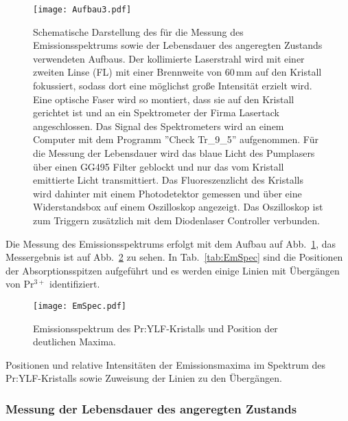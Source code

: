 \begin{figure}[H]
\begin{center}
  \texttt{[image: Aufbau3.pdf]}
  \caption{Schematische Darstellung des für die Messung des Emissionsspektrums sowie der
  Lebensdauer des angeregten Zustands verwendeten Aufbaus.
    Der kollimierte Laserstrahl wird mit einer zweiten Linse (FL) mit einer Brennweite von 60\,mm auf
  den Kristall fokussiert, sodass dort eine möglichst große Intensität erzielt wird.
  Eine optische Faser wird so montiert, dass sie auf den Kristall gerichtet ist und an ein
  Spektrometer der Firma Lasertack angeschlossen.
  Das Signal des Spektrometers wird an einem Computer mit dem Programm ''Check Tr\_9\_5''
  aufgenommen.
  Für die Messung der Lebensdauer wird das blaue Licht des Pumplasers über einen GG495 Filter
  geblockt und nur das vom Kristall emittierte Licht transmittiert.
  Das Fluoreszenzlicht des Kristalls wird dahinter mit einem Photodetektor gemessen und
  über eine Widerstandsbox auf einem Oszilloskop angezeigt.
  Das Oszilloskop ist zum Triggern zusätzlich mit dem Diodenlaser Controller verbunden.}
  \label{img:aufbau3}
\end{center}
\end{figure}

Die Messung des Emissionsspektrums erfolgt mit dem Aufbau auf Abb.~\ref{img:aufbau3},
das Messergebnis ist auf Abb.~\ref{img:EmSpec} zu sehen.
In Tab.~\ref{tab:EmSpec} sind die Positionen der Absorptionsspitzen aufgeführt und
es werden einige Linien mit Übergängen von Pr$^{3+}$
identifiziert.

\begin{figure}[H]
\begin{center}
  \texttt{[image: EmSpec.pdf]}
  \caption{Emissionsspektrum des Pr:YLF-Kristalls und Position der deutlichen Maxima.}
  \label{img:EmSpec}
\end{center}
\end{figure}

\begin{table}[htb]
\caption{Positionen und relative Intensitäten der Emissionsmaxima im Spektrum des
Pr:YLF-Kristalls sowie Zuweisung der Linien zu den Übergängen.}

\label{tab:EmSpec}
\end{table}


\FloatBarrier


\subsubsection{Messung der Lebensdauer des angeregten Zustands}

